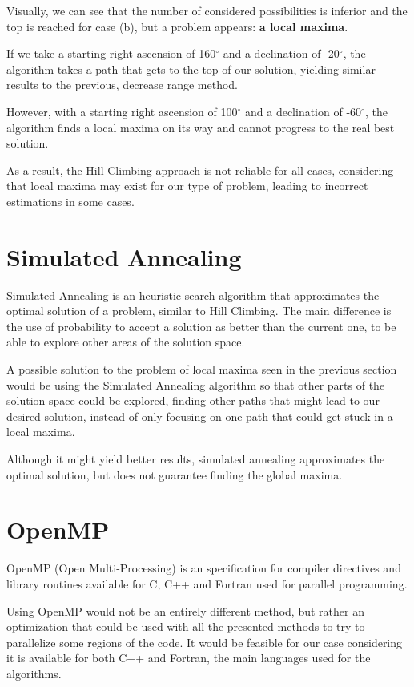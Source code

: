 Visually, we can see that the number of considered possibilities is inferior and the top is reached for case (b), but a problem appears: \textbf{a local maxima}.

If we take a starting right ascension of 160$^{\circ}$ and a declination of -20$^{\circ}$, the algorithm takes a path that gets to the top of our solution, yielding similar results to the previous, decrease range method.

However, with a starting right ascension of 100$^{\circ}$ and a declination of -60$^{\circ}$, the algorithm finds a local maxima on its way and cannot progress to the real best solution.

As a result, the Hill Climbing approach is not reliable for all cases, considering that local maxima may exist for our type of problem, leading to incorrect estimations in some cases.

\section{Simulated Annealing}

Simulated Annealing is an heuristic search algorithm that approximates the optimal solution of a problem, similar to Hill Climbing. The main difference is the use of probability to accept a solution as better than the current one, to be able to explore other areas of the solution space.

A possible solution to the problem of local maxima seen in the previous section would be using the Simulated Annealing algorithm so that other parts of the solution space could be explored, finding other paths that might lead to our desired solution, instead of only focusing on one path that could get stuck in a local maxima.

Although it might yield better results, simulated annealing approximates the optimal solution, but does not guarantee finding the global maxima.

\section{OpenMP}

OpenMP (Open Multi-Processing) is an specification for compiler directives and library routines available for C, C++ and Fortran used for parallel programming.

Using OpenMP would not be an entirely different method, but rather an optimization that could be used with all the presented methods to try to parallelize some regions of the code. It would be feasible for our case considering it is available for both C++ and Fortran, the main languages used for the algorithms.

